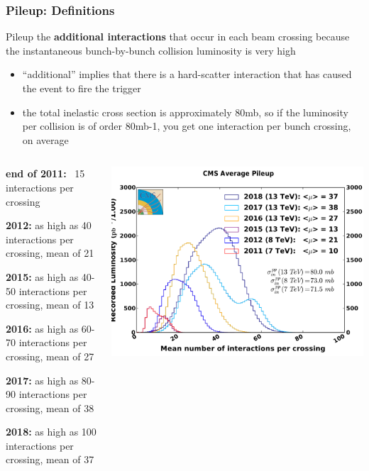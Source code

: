 \begin{frame}[t]\frametitle{Pileup: Definitions}
	\vspace*{-0.4cm}
	\begin{block}{Pileup}
		the \textbf{additional interactions} that occur in each beam crossing because the instantaneous bunch-by-bunch collision luminosity is very high
		\begin{itemize}
			\small
			\item ``additional'' implies that there is a hard-scatter interaction that has caused the event to fire the trigger
			\item the total inelastic cross section is approximately 80mb, so if the luminosity per collision is of order 80mb-1, you get one interaction per bunch crossing, on average
		\end{itemize}
	\end{block}
	\vspace*{-0.25cm}
	\begin{columns}[T]
		\begin{column}{0.48\textwidth}
			\vspace*{-0.15cm}
			\begin{exampleblock}{}
				\begin{customlist}{2.5em}{0em}
					\scriptsize
					\item \textbf{end of 2011:} ~15 interactions per crossing
					\item \textbf{2012:} as high as 40 interactions per crossing, mean of 21
					\item \textbf{2015:} as high as 40-50 interactions per crossing, mean of 13
					\item \textbf{2016:} as high as 60-70 interactions per crossing, mean of 27
					\item \textbf{2017:} as high as 80-90 interactions per crossing, mean of 38
					\item \textbf{2018:} as high as 100 interactions per crossing, mean of 37
				\end{customlist}
			\end{exampleblock}
		\end{column}
		\begin{column}{0.48\textwidth}
			\includegraphics[width=\textwidth]{images/pileup/pileup_allYears.pdf}

\end{column}
\end{columns}
\end{frame}
